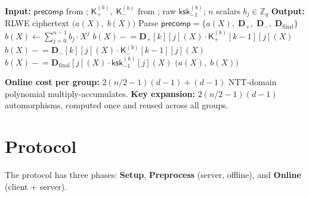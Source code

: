 \documentclass[11pt,a4paper]{article}
\newcommand{\Z}{\mathbb{Z}}
\begin{document}
\begin{algorithm}[H]
\caption{$\textsc{InspiRINGOnline}(\mathsf{precomp},\; \mathsf{K}_{+}^{(b)},\; \mathsf{K}_{-}^{(b)},\; \mathsf{ksk}_{-1}^{(b)},\; b_0, \ldots, b_{n-1})$: Pack one group.}
\label{alg:pack-online}
\begin{algorithmic}[1]
\State \textbf{Input:} $\mathsf{precomp}$ from ; $\mathsf{K}_{+}^{(b)},\; \mathsf{K}_{-}^{(b)}$ from ; raw $\mathsf{ksk}_{-1}^{(b)}$; $n$ scalars $b_j \in \Z_q$
\State \textbf{Output:} RLWE ciphertext $\bigl(a(X),\; b(X)\bigr)$
\Statex
\State Parse $\mathsf{precomp} = \{a(X),\; \mathbf{D}_{+},\; \mathbf{D}_{-},\; \mathbf{D}_{\mathrm{final}}\}$
\State $b(X) \gets \sum_{j=0}^{n-1} b_j \cdot X^j$ 
\Statex
\State {}
        \State $b(X) \mathrel{-}= \mathbf{D}_{+}[k][j](X) \cdot \mathsf{K}_{+}^{(b)}[k\!-\!1][j](X)$
    \EndFor
\EndFor
\Statex
\State {}
        \State $b(X) \mathrel{-}= \mathbf{D}_{-}[k][j](X) \cdot \mathsf{K}_{-}^{(b)}[k\!-\!1][j](X)$
    \EndFor
\EndFor
\Statex
\State {}
    \State $b(X) \mathrel{-}= \mathbf{D}_{\mathrm{final}}[j](X) \cdot \mathsf{ksk}_{-1}^{(b)}[j](X)$
\EndFor
\State \Return $\bigl(a(X),\; b(X)\bigr)$
\end{algorithmic}
\end{algorithm}

\textbf{Online cost per group:} $2(n/2 - 1)(d\!-\!1) + (d\!-\!1)$ NTT-domain polynomial multiply-accumulates.
\textbf{Key expansion:} $2(n/2 - 1)(d\!-\!1)$ automorphisms, computed once and reused across all groups.

\section{Protocol}\label{sec:protocol}

The protocol has three phases: \textbf{Setup}, \textbf{Preprocess} (server, offline), and \textbf{Online} (client + server).

\end{document}
